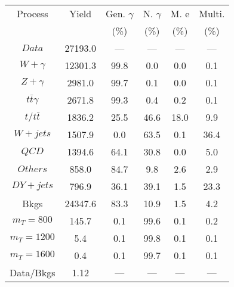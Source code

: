 \begin{figure}
\begin{minipage}[c]{0.32\textwidth}
{\begin{tabular}{cccccc}
\hline
Process & Yield & Gen. $\gamma$ & N. $\gamma$ & M. e & Multi. \\
 &  & (\%) & (\%) & (\%) & (\%)  \\
\hline
                                                                      $ Data $ &  27193.0 &  --- &  --- &  --- &  ---\\
$ W+\gamma $ &  12301.3 &  99.8 &  0.0 &  0.0 &  0.1\\
$ Z+\gamma $ &  2981.0 &  99.7 &  0.1 &  0.0 &  0.1\\
$ t\bar{t}\gamma $ &  2671.8 &  99.3 &  0.4 &  0.2 &  0.1\\
$ t/t\bar{t} $ &  1836.2 &  25.5 &  46.6 &  18.0 &  9.9\\
$ W+jets $ &  1507.9 &  0.0 &  63.5 &  0.1 &  36.4\\
$ QCD $ &  1394.6 &  64.1 &  30.8 &  0.0 &  5.0\\
$ Others $ &  858.0 &  84.7 &  9.8 &  2.6 &  2.9\\
$ DY+jets $ &  796.9 &  36.1 &  39.1 &  1.5 &  23.3\\
Bkgs &  24347.6 &  83.3 &  10.9 &  1.5 &  4.2\\
$ m_{T} = 800 $ &  145.7 &  0.1 &  99.6 &  0.1 &  0.2\\
$ m_{T} = 1200 $ &  5.4 &  0.1 &  99.8 &  0.1 &  0.1\\
$ m_{T} = 1600 $ &  0.4 &  0.1 &  99.7 &  0.1 &  0.1\\
Data/Bkgs &  1.12 &  --- &  --- &  --- &  ---\\
\hline
\end{tabular}
}
\end{minipage}
\end{figure}

